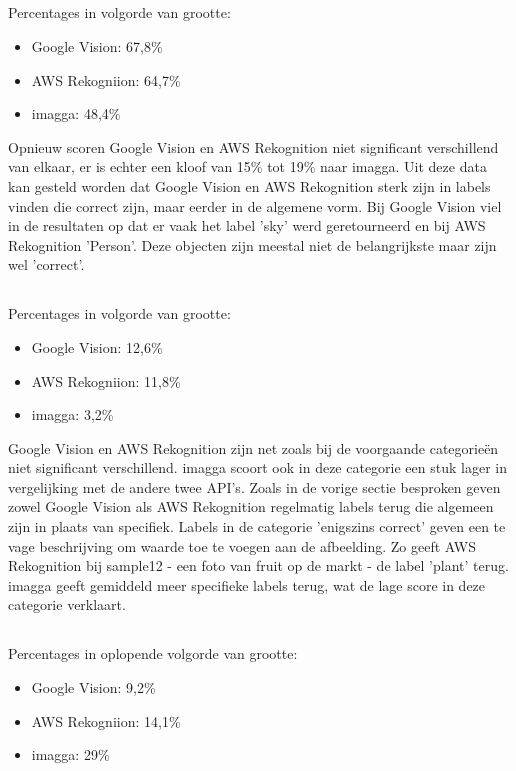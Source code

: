\subsection{}
\label{sec:resultaten-correct}
Percentages in volgorde van grootte:
\begin{itemize}
    \item Google Vision: 67,8\%
    \item AWS Rekogniion: 64,7\%
    \item imagga: 48,4\%
\end{itemize}

Opnieuw scoren Google Vision en AWS Rekognition niet significant verschillend van elkaar, er is echter een kloof van 15\% tot 19\% naar imagga. Uit deze data kan gesteld worden dat Google Vision en AWS Rekognition sterk zijn in labels vinden die correct zijn, maar eerder in de algemene vorm. Bij Google Vision viel in de resultaten op dat er vaak het label 'sky' werd geretourneerd en bij AWS Rekognition 'Person'. Deze objecten zijn meestal niet de belangrijkste maar zijn wel 'correct'.

\subsection{}
\label{sec:resultaten-enigszins-correct}
Percentages in volgorde van grootte:
\begin{itemize}
    \item Google Vision: 12,6\%
    \item AWS Rekogniion: 11,8\%
    \item imagga: 3,2\%
\end{itemize}

Google Vision en AWS Rekognition zijn net zoals bij de voorgaande categorieën niet significant verschillend. imagga scoort ook in deze categorie een stuk lager in vergelijking met de andere twee API's. Zoals in de vorige sectie besproken geven zowel Google Vision als AWS Rekognition regelmatig labels terug die algemeen zijn in plaats van specifiek. Labels in de categorie 'enigszins correct' geven een te vage beschrijving om waarde toe te voegen aan de afbeelding. Zo geeft AWS Rekognition bij sample12 - een foto van fruit op de markt - de label 'plant' terug. imagga geeft gemiddeld meer specifieke labels terug, wat de lage score in deze categorie verklaart.

\subsection{}
\label{sec:resultaten-niet-correct}
Percentages in oplopende volgorde van grootte:
\begin{itemize}
    \item Google Vision: 9,2\%
    \item AWS Rekogniion: 14,1\%
    \item imagga: 29\%
\end{itemize}

